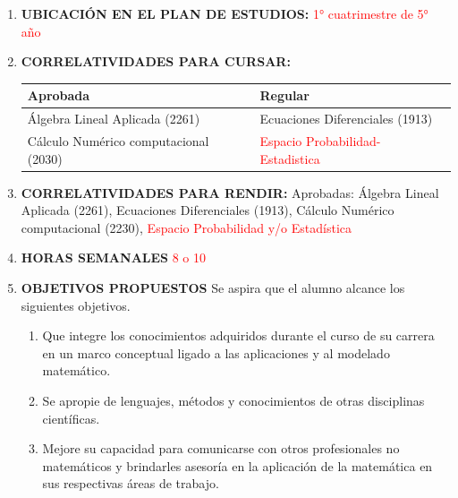 \documentclass[12pt]{article}
\begin{document}
\begin{enumerate}
\item \textbf{UBICACIÓN EN EL PLAN DE ESTUDIOS:} \textcolor{red}{1° cuatrimestre de 5° año}
\item 
\textbf{CORRELATIVIDADES PARA CURSAR:}

\begin{table}[h]
    \begin{center}
      \begin{tabular}{|l|l|}\hline
	  Aprobada                              &    Regular                        \\ \hline
	  Álgebra Lineal Aplicada (2261)        &    Ecuaciones Diferenciales (1913)\\ \hline
	  Cálculo Numérico computacional (2030) &    \textcolor{red}{Espacio Probabilidad- Estadistica}                \\ \hline
      \end{tabular}
    \end{center}
 \end{table}

\item  \textbf{CORRELATIVIDADES PARA RENDIR:}
Aprobadas:  Álgebra Lineal Aplicada (2261),  Ecuaciones Diferenciales (1913),   Cálculo Numérico computacional (2230), \textcolor{red}{Espacio Probabilidad y/o  Estadística}

\item\textbf{HORAS SEMANALES} \textcolor{red}{8 o 10}


 \item \textbf{OBJETIVOS PROPUESTOS}
      Se aspira que el alumno alcance los siguientes objetivos.

      \begin{enumerate}
      
        \item\label{it:1} Que integre los conocimientos adquiridos  durante el curso de su carrera en un marco conceptual ligado a las aplicaciones y al modelado matemático.

        
	\item\label{it:2} Se apropie de lenguajes, métodos y conocimientos de otras disciplinas científicas.

           \item\label{it:3} Mejore su capacidad para comunicarse con otros profesionales no matemáticos y brindarles asesoría en la aplicación de la matemática en sus respectivas áreas de trabajo.


\end{enumerate}
\end{enumerate}
\end{document}
